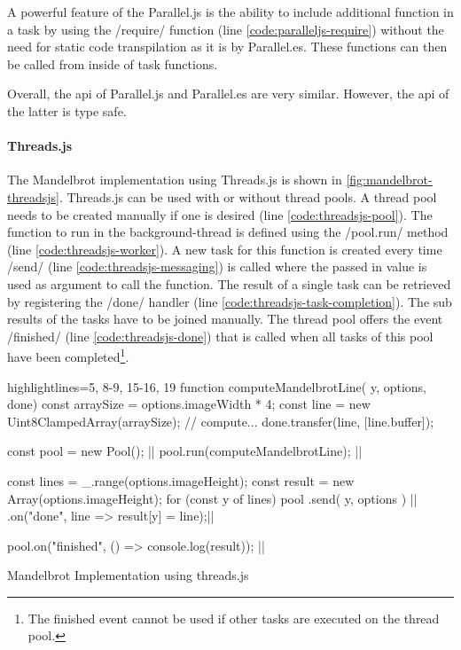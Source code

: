 A powerful feature of the Parallel.js is the ability to include additional function in a task by using the \javascriptinline/require/ function (line \ref{code:paralleljs-require}) without the need for static code transpilation as it is by Parallel.es. These functions can then be called from inside of task functions. 

Overall, the api of Parallel.js and Parallel.es are very similar. However, the api of the latter is type safe.


\paragraph{Threads.js}
 The Mandelbrot implementation using Threads.js is shown in \cref{fig:mandelbrot-threadsjs}. Threads.js can be used with or without thread pools. A thread pool needs to be created manually if one is desired (line \ref{code:threadsjs-pool}). The function to run in the background-thread is defined using the \javascriptinline/pool.run/ method (line \ref{code:threadsjs-worker}). A new task for this function is created every time \javascriptinline/send/ (line \ref{code:threadsjs-messaging}) is called where the passed in value is used as argument to call the function. The result of a single task can be retrieved by registering the \javascriptinline/done/ handler (line \ref{code:threadsjs-task-completion}). The sub results of the tasks have to be joined manually. The thread pool offers the event \javascriptinline/finished/ (line \ref{code:threadsjs-done}) that is called when all tasks of this pool have been completed\footnote{The finished event cannot be used if other tasks are executed on the thread pool.}.

\begin{listing}
	\begin{javascriptcode*}{highlightlines={5, 8-9, 15-16, 19}}
function computeMandelbrotLine({ y, options}, done) {
	const arraySize = options.imageWidth * 4;
	const line = new Uint8ClampedArray(arraySize);
	// compute...
	done.transfer(line, [line.buffer]);
}

const pool = new Pool(); |$\label{code:threadsjs-pool}$|
pool.run(computeMandelbrotLine); |$\label{code:threadsjs-worker}$|

const lines = _.range(options.imageHeight);
const result = new Array(options.imageHeight);
for (const y of lines) {
	pool
		.send({ y, options }) |$\label{code:threadsjs-messaging}$|
		.on("done", line => result[y] = line);|$\label{code:threadsjs-task-completion}$|
}

pool.on("finished", () => console.log(result)); |$\label{code:threadsjs-done}$|
\end{javascriptcode*}
\caption{Mandelbrot Implementation using threads.js}
\label{fig:mandelbrot-threadsjs}
\end{listing}


